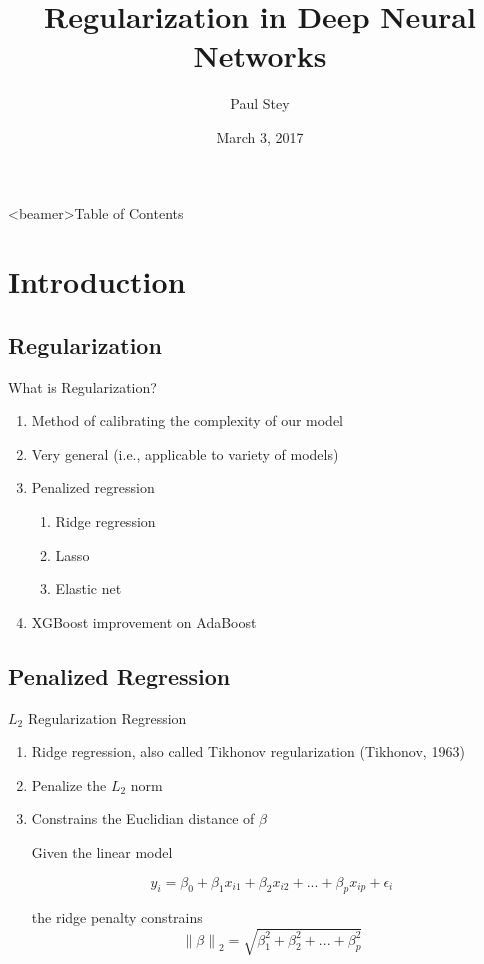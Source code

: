 \documentclass[pdf]{beamer}
\title[Regularization]{Regularization in Deep Neural Networks}
\author{Paul Stey}
\date{March 3, 2017}
\newcommand\norm[1]{\left\lVert#1\right\rVert}
\begin{document}
\begin{frame}
\titlepage
\end{frame}



\begin{frame}<beamer>{Table of Contents}
	\tableofcontents[currentsection, 
				 currentsubsection, 
				 sectionstyle=show, 
				 subsectionstyle=show]
\end{frame}


\section{Introduction}
	\subsection{Regularization}
		\begin{frame}{What is Regularization?}
			\begin{enumerate}
				\item Method of calibrating the complexity of our model
				\item Very general (i.e., applicable to variety of models)
				\item Penalized regression
					\begin{enumerate} [1]
						\item Ridge regression
						\item Lasso 
						\item Elastic net
					\end{enumerate}
				\item XGBoost improvement on AdaBoost 
			\end{enumerate}
		\end{frame}
			
	
		
		
	\subsection{Penalized Regression}
	
				
		\begin{frame}{$L_2$ Regularization Regression}
		\begin{enumerate}
			\item Ridge regression, also called Tikhonov regularization (Tikhonov, 1963)
			\item Penalize the $L_2$ norm 
			\item Constrains the Euclidian distance of $\beta$	
				\newline
				
				Given the linear model
				\vspace{-1.5em}
				\begin{center}
				$$ y_i = \beta_0 + \beta_1x_{i1} + \beta_2x_{i2} + ... + \beta_px_{ip} + \epsilon_i $$
				\end{center}
			
				the ridge penalty constrains
				$$ \norm{\beta}_2 = \sqrt{\beta_{1}^2 + \beta_{2}^2 + ... + \beta_{p}^2} $$
		\end{enumerate}
		\end{frame}
		
\end{document}
